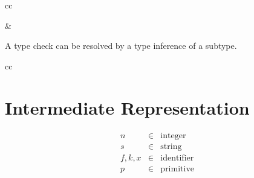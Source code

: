 \documentclass[11pt]{article}
\newcommand{\kw}[1]{\mathtt{#1}}
\begin{document}
\begin{rules}{cc}


&


\end{rules}

A type check can be resolved by a type inference of a subtype.

\begin{rules}{cc}


\end{rules}

\newpage

\section{Intermediate Representation}

\newcommand{\appc}[2]{#1\;#2}
\newcommand{\appf}[3]{#1\;#2\;#3}
\newcommand{\letc}[4]{\kw{letc}\;#1\;#2 = #3\;\kw{in}\;#4}

\newcommand{\defterm}[4]{#1\;#2\;#3 = #4}
\newcommand{\letf}[2]{\kw{letf}\;\repo{#1}\;\kw{in}\;#2}
\newcommand{\letff}[2]{\kw{letf}\;#1\;\kw{in}\;#2}

\newcommand{\letv}[3]{\kw{letv}\;#1 = #2\;\kw{in}\;#3}

\newcommand{\funv}[3]{\kw{fun}\;#1\;#2\;.\;#3}
\newcommand{\intv}[1]{#1}
\newcommand{\prmv}[2]{#1(#2)}
\newcommand{\rowv}[2]{\{ \repo{#1 = #2} \}}
\newcommand{\rowvs}[2]{\{ #1 \}}
\newcommand{\strv}[1]{#1}

\newcommand{\andv}[2]{\kw{concat}\;#1\;#2}
\newcommand{\argv}[1]{\kw{argument}\;#1}
\newcommand{\capv}[2]{\kw{capability}\;#1\;#2}
\newcommand{\selv}[2]{\kw{select}\;#1\;#2}

\[
\begin{array}{lcl}
n & \in & \text{integer} \\
s & \in & \text{string} \\
f, k, x & \in & \text{identifier} \\
p & \in & \text{primitive} \\
\end{array}
\]
\end{document}
